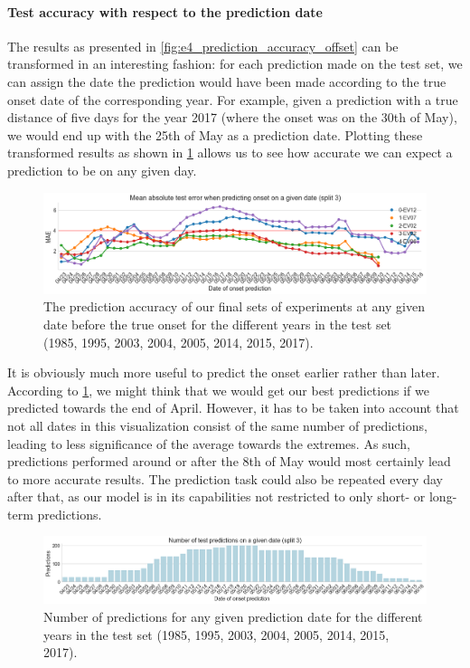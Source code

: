 \paragraph{Test accuracy with respect to the prediction date}
The results as presented in \cref{fig:e4_prediction_accuracy_offset} can be transformed in an interesting fashion: for each prediction made on the test set, we can assign the date the prediction would have been made according to the true onset date of the corresponding year. For example, given a prediction with a true distance of five days for the year 2017 (where the onset was on the 30th of May), we would end up with the 25th of May as a prediction date. Plotting these transformed results as shown in \cref{fig:e4_prediction_accuracy_dates} allows us to see how accurate we can expect a prediction to be on any given day.

\begin{figure}[h!]
  \centering
  \includegraphics[width=\linewidth]{./99_appendix/img/prediction_accuracy_dates}
  \caption{The prediction accuracy of our final sets of experiments at any given date before the true onset for the different years in the test set (1985, 1995, 2003, 2004, 2005, 2014, 2015, 2017).}
  \label{fig:e4_prediction_accuracy_dates}
\end{figure}

It is obviously much more useful to predict the onset earlier rather than later. According to \cref{fig:e4_prediction_accuracy_dates}, we might think that we would get our best predictions if we predicted towards the end of April. However, it has to be taken into account that not all dates in this visualization consist of the same number of predictions, leading to less significance of the average towards the extremes. As such, predictions performed around or after the 8th of May would most certainly lead to more accurate results. The prediction task could also be repeated every day after that, as our model is in its capabilities not restricted to only short- or long-term predictions.

\begin{figure}[h!]
  \centering
  \includegraphics[width=\linewidth]{./99_appendix/img/prediction_accuracy_dates_dist}
  \caption{Number of predictions for any given prediction date for the different years in the test set (1985, 1995, 2003, 2004, 2005, 2014, 2015, 2017).}
  \label{fig:e4_prediction_dist}
\end{figure}

